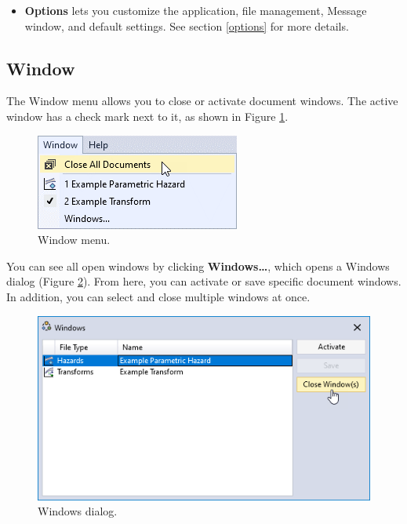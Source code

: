 \documentclass[
]{book}
\providecommand{\tightlist}{%
  \setlength{\itemsep}{0pt}\setlength{\parskip}{0pt}}
\begin{document}
\begin{itemize}
\tightlist
\item
  \textbf{Options} lets you customize the application, file management, Message window, and default settings. See section \ref{options} for more details.
\end{itemize}

\hypertarget{gui-menu-bar-window}{%
\subsection{Window}\label{gui-menu-bar-window}}

The Window menu allows you to close or activate document windows. The active window has a check mark next to it, as shown in Figure \ref{fig:figure-13}.

\begin{figure}

{\centering \includegraphics{images/figure13} 

}

\caption{Window menu.}\label{fig:figure-13}
\end{figure}

You can see all open windows by clicking \textbf{Windows\ldots{}}, which opens a Windows dialog (Figure \ref{fig:figure-14}). From here, you can activate or save specific document windows. In addition, you can select and close multiple windows at once.

\begin{figure}

{\centering \includegraphics{images/figure14} 

}

\caption{Windows dialog.}\label{fig:figure-14}
\end{figure}
\end{document}
